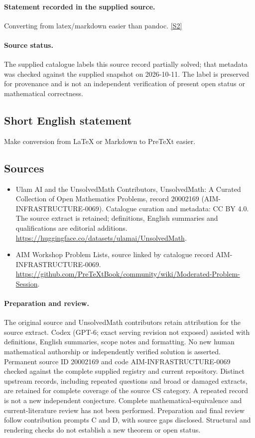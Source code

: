\documentclass[11pt]{article}
\newcommand{\sref}[2]{\hyperlink{source:#1:#2}{[S#2]}}
\begin{document}
\paragraph{Statement recorded in the supplied source.}
Converting from latex/markdown easier than pandoc. \sref{20002169}{2}
\paragraph{Source status.}
The supplied catalogue labels this source record partially solved; that metadata was checked against the supplied snapshot on 2026-10-11. The label is preserved for provenance and is not an independent verification of present open status or mathematical correctness.
\subsection{Short English statement}
Make conversion from LaTeX or Markdown to PreTeXt easier.
\subsection{Sources}
\begin{itemize}
\item[\hypertarget{source:20002169:1}{S1}] Ulam AI and the UnsolvedMath Contributors, UnsolvedMath: A Curated Collection of Open Mathematics Problems, record 20002169 (AIM-INFRASTRUCTURE-0069). Catalogue curation and metadata: CC BY 4.0. The source extract is retained; definitions, English summaries and qualifications are editorial additions.
\url{https://huggingface.co/datasets/ulamai/UnsolvedMath}.
\item[\hypertarget{source:20002169:2}{S2}] AIM Workshop Problem Lists, source linked by catalogue record AIM-INFRASTRUCTURE-0069.
\url{https://github.com/PreTeXtBook/community/wiki/Moderated-Problem-Session}.
\end{itemize}
\paragraph{Preparation and review.}
The original source and UnsolvedMath contributors retain attribution for the source extract. Codex (GPT-6; exact serving revision not exposed) assisted with definitions, English summaries, scope notes and formatting. No new human mathematical authorship or independently verified solution is asserted. Permanent source ID 20002169 and code AIM-INFRASTRUCTURE-0069 checked against the complete supplied registry and current repository. Distinct upstream records, including repeated questions and broad or damaged extracts, are retained for complete coverage of the source CS category. A repeated record is not a new independent conjecture. Complete mathematical-equivalence and current-literature review has not been performed. Preparation and final review follow contribution prompts C and D, with source gaps disclosed. Structural and rendering checks do not establish a new theorem or open status.
\label{end:20002169}
\end{document}
